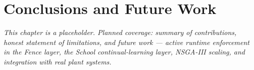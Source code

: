 \chapter{Conclusions and Future Work}
\label{ch:conclusions}

\textit{This chapter is a placeholder. Planned coverage: summary of
contributions, honest statement of limitations, and future work ---
active runtime enforcement in the Fence layer, the School continual-learning
layer, NSGA-III scaling, and integration with real plant systems.}
